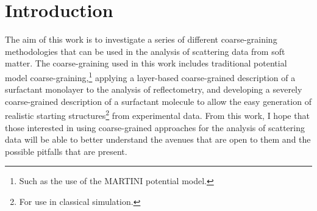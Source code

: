 
\chapter{Introduction} %

\label{introduction} %


The aim of this work is to investigate a series of different coarse-graining methodologies that can be used in the analysis of scattering data from soft matter.
The coarse-graining used in this work includes traditional potential model coarse-graining,\footnote{Such as the use of the MARTINI potential model.} applying a layer-based coarse-grained description of a surfactant monolayer to the analysis of reflectometry, and developing a severely coarse-grained description of a surfactant molecule to allow the easy generation of realistic starting structures\footnote{For use in classical simulation.} from experimental data.
From this work, I hope that those interested in using coarse-grained approaches for the analysis of scattering data will be able to better understand the avenues that are open to them and the possible pitfalls that are present. 






